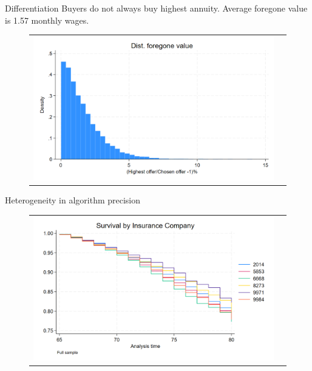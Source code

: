 \documentclass[10pt,aspectratio=169]{beamer}
\begin{document}
\begin{frame}{Differentiation}\label{slide:fig2}    
Buyers do not always buy highest annuity. Average foregone value is 1.57 monthly wages.
\begin{figure}[H]
\centering{}%
\begin{tabular}{cc}
\includegraphics[scale=0.25]{../figures/IE3_foregone_hist.png}
\end{tabular}
\end{figure}
\hyperlink{slide:Descriptive_evidence}{}
\end{frame}




\begin{frame}{Heterogeneity in algorithm precision}\label{slide:fig3}    
\begin{figure}[H]
\centering{}%
\begin{tabular}{cc}
\includegraphics[scale=0.264]{../figures/IE6/IE6_survival_year_all.png}
\end{tabular}
\end{figure}
\hyperlink{slide:Descriptive_evidence}{}
\end{frame}
\end{document}
